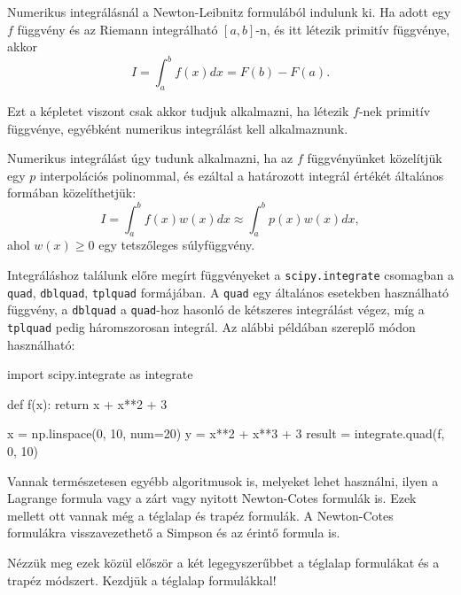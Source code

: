 
    Numerikus integrálásnál a Newton-Leibnitz formulából indulunk ki. Ha
adott egy \(f\) függvény és az Riemann integrálható \([a, b]\)-n, és itt
létezik primitív függvénye, akkor
\[
I = \int^b_a f(x)dx = F(b) - F(a).
\]

Ezt a képletet viszont csak akkor tudjuk alkalmazni, ha létezik \(f\)-nek
primitív függvénye, egyébként numerikus integrálást kell alkalmaznunk.

Numerikus integrálást úgy tudunk alkalmazni, ha az \(f\) függvényünket
közelítjük egy \(p\) interpolációs polinommal, és ezáltal a határozott
integrál értékét általános formában közelíthetjük:
\[
I = \int_a^b f(x)w(x)dx \approx \int_a^b p(x)w(x)dx,
\]
ahol $w(x) \geq 0$ egy tetszőleges súlyfüggvény.

    Integráláshoz találunk előre megírt függvényeket a \texttt{scipy.integrate}
csomagban a \texttt{quad}, \texttt{dblquad}, \texttt{tplquad} formájában. A \texttt{quad} egy általános esetekben használható függvény, a
\texttt{dblquad} a \texttt{quad}-hoz hasonló de kétszeres integrálást
végez, míg a \texttt{tplquad} pedig háromszorosan integrál.
Az alábbi példában szereplő módon használható:
\begin{python}
import scipy.integrate as integrate

def f(x):
    return x + x**2 + 3

x = np.linspace(0, 10, num=20)
y = x**2 + x**3 + 3    
result = integrate.quad(f, 0, 10)
\end{python}

    Vannak természetesen egyébb algoritmusok is, melyeket lehet használni, ilyen a
Lagrange formula vagy a zárt vagy nyitott Newton-Cotes formulák is. Ezek
mellett ott vannak még a téglalap és trapéz formulák. A Newton-Cotes
formulákra visszavezethető a Simpson és az érintő formula is.

    Nézzük meg ezek közül először a két legegyszerűbbet a téglalap
formulákat és a trapéz módszert. Kezdjük a téglalap formulákkal!

